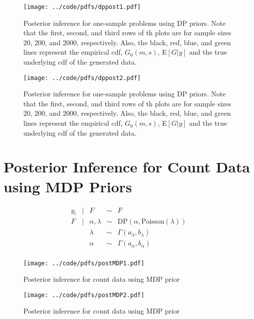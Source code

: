 \documentclass{article}
\def\beginmyfig{\begin{figure}[htbp]\begin{center}}
\def\endmyfig{\end{center}\end{figure}}
\begin{document}
\beginmyfig
  \texttt{[image: ../code/pdfs/dppost1.pdf]}
  \caption{Posterior inference for one-sample problems using 
  DP priors. Note that the first, second, and third rows of th plots are for
  sample sizes 20, 200, and 2000, respectively.  Also, the black, red, blue, and
  green lines represent the empirical cdf, $G_0(m,s)$, E$[G|y]$ and the true
  underlying cdf of the generated data.}
\endmyfig
\beginmyfig
  \texttt{[image: ../code/pdfs/dppost2.pdf]}
  \caption{Posterior inference for one-sample problems using 
  DP priors. Note that the first, second, and third rows of th plots are for
  sample sizes 20, 200, and 2000, respectively.  Also, the black, red, blue, and
  green lines represent the empirical cdf, $G_0(m,s)$, E$[G|y]$ and the true
  underlying cdf of the generated data.}
\endmyfig


\newpage
\section{Posterior Inference for Count Data using MDP Priors}
\[
  \begin{array}{rclcl}
    y_i &|& F &\sim & F \\
    F &|& \alpha, \lambda &\sim& \text{DP}(\alpha,\text{Poisson}(\lambda)) \\
      && \lambda &\sim& \Gamma(a_\lambda,b_\lambda) \\
      && \alpha &\sim& \Gamma(a_\alpha,b_\alpha) \\
  \end{array}
\]
\beginmyfig
  \texttt{[image: ../code/pdfs/postMDP1.pdf]}
  \caption{Posterior inference for count data using MDP prior}
\endmyfig
\beginmyfig
  \texttt{[image: ../code/pdfs/postMDP2.pdf]}
  \caption{Posterior inference for count data using MDP prior}
\endmyfig
\end{document}
